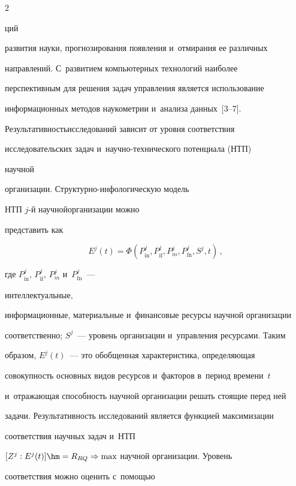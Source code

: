 \begin{multicols}{2}
\noindent

ций 

развития науки, прогнозирования появления и~отмирания ее различных 

направлений. С~развитием компьютерных технологий наиболее 

перспективным для решения задач управления является использование 

информационных методов нау\-ко\-мет\-рии и~анализа данных~[3--7]. 

Результативность\linebreak исследований зависит от уровня соответствия 

исследовательских задач и~на\-уч\-но-тех\-ни\-че\-ско\-го потенциала (НТП)

научной 

организации. Струк\-тур\-но-ин\-фо\-ло\-ги\-че\-скую модель  

НТП $j$-й научной\linebreak организации можно 

представить как 

    \begin{equation*}

    E^j(t)=\Phi\left( P^j_{\mathrm{in}}, P^j_{\mathrm{if}}, P^j_m, P^j_{\mathrm{fn}}, S^j, t\right)\,,


    \end{equation*}

где $P^j_{\mathrm{in}}$, $P^j_{\mathrm{if}}$, $P^j_m$ и~$P^j_{\mathrm{fn}}$~--- 

интеллектуальные, 

информационные, материальные и~финансовые ресурсы научной организации 

соответственно; $S^j$~--- уровень организации и~управления ресурсами. Таким 

образом, $E^j(t)$~--- это обобщенная характеристика, определяющая 

совокупность основных видов ресурсов и~факторов в~период времени~$t$ 

и~отражающая способность научной организации решать стоящие перед ней 

задачи. Результативность исследований является функцией максимизации 

соответствия научных задач и~НТП

$[Z^j: E^j(t)]\hm= R_{RQ}\Rightarrow \max$ научной организации. Уровень 

соответствия можно оценить с~по\-мощью  


\end{multicols}
